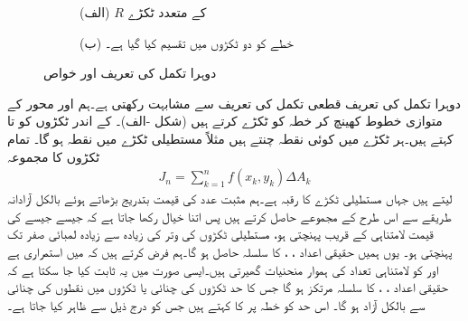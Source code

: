 \begin{figure}
\centering
\begin{subfigure}{0.5\textwidth}
\centering
{}
\caption*{(الف) $R$ کے متعدد ٹکڑے}
\end{subfigure}%
\begin{subfigure}{0.5\textwidth}
\centering
{}
\caption*{(ب) خطے کو دو ٹکڑوں میں تقسیم کیا گیا ہے۔}
\end{subfigure}%
\caption{دوہرا تکمل کی تعریف اور خواص}
\label{شکل_خطی_تکمل_خطے_کے_ٹکڑے_الف}
\end{figure}
دوہرا تکمل کی تعریف قطعی تکمل کی تعریف سے مشابہت رکھتی ہے۔ہم  اور  محور کے متوازی خطوط کھینچ کر خطہ  کو ٹکڑے کرتے ہیں (شکل -الف)۔  کے اندر ٹکڑوں  کو  تا  کہتے ہیں۔ہر ٹکڑے میں کوئی نقطہ چنتے ہیں مثلاً  مستطیلی ٹکڑے میں نقطہ  ہو گا۔ تمام ٹکڑوں کا مجموعہ
\begin{align}\label{مساوات_خطی_تکمل_دوہرا_تکمل_مجموعہ}
J_n=\sum_{k=1}^n f(x_k,y_k)\Delta A_k
\end{align}
لیتے ہیں جہاں  مستطیلی ٹکڑے کا رقبہ  ہے۔ہم مثبت عدد  کی قیمت بتدریج بڑھاتے ہوئے  بالکل آزادانہ طریقے سے اس طرح کے مجموعے حاصل کرتے ہیں پس اتنا خیال رکھا جاتا ہے کہ جیسے جیسے  کی قیمت لامتناہی کے قریب پہنچتی ہو، مستطیلی ٹکڑوں کی وتر کی زیادہ سے زیادہ لمبائی صفر تک پہنچتی ہو۔  یوں ہمیں حقیقی اعداد ، ،  کا سلسلہ حاصل ہو گا۔ہم فرض کرتے ہیں کہ  میں  استمراری ہے اور  کو لامتناہی تعداد  کی ہموار منحنیات گھیرتی ہیں۔ایسی صورت میں یہ ثابت کیا جا سکتا ہے کہ  حقیقی اعداد ، ،  کا سلسلہ مرتکز ہو گا جس کا حد ٹکڑوں کی چنائی یا ٹکڑوں میں نقطوں  کی چنائی سے بالکل آزاد ہو گا۔ اس حد کو خطہ  پر  کا  کہتے ہیں جس کو درج ذیل سے ظاہر کیا جاتا ہے۔
